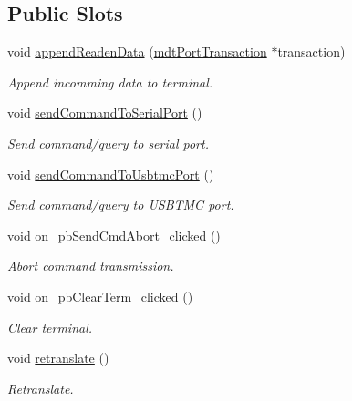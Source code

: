 \subsection*{Public Slots}
\begin{DoxyCompactItemize}
\item 
void \hyperlink{classmdt_port_term_a2c8de2e82437fc94420ccb542cc42bf2}{append\-Readen\-Data} (\hyperlink{classmdt_port_transaction}{mdt\-Port\-Transaction} $\ast$transaction)
\begin{DoxyCompactList}\small\item\em Append incomming data to terminal. \end{DoxyCompactList}\item 
void \hyperlink{classmdt_port_term_ae83cb3183870f167426d1ede3ebca5b9}{send\-Command\-To\-Serial\-Port} ()
\begin{DoxyCompactList}\small\item\em Send command/query to serial port. \end{DoxyCompactList}\item 
void \hyperlink{classmdt_port_term_a52a207c0d9343638828feb4a631eed89}{send\-Command\-To\-Usbtmc\-Port} ()
\begin{DoxyCompactList}\small\item\em Send command/query to U\-S\-B\-T\-M\-C port. \end{DoxyCompactList}\item 
void \hyperlink{classmdt_port_term_a1b232e686b401d7103eb1c682be330a9}{on\-\_\-pb\-Send\-Cmd\-Abort\-\_\-clicked} ()
\begin{DoxyCompactList}\small\item\em Abort command transmission. \end{DoxyCompactList}\item 
void \hyperlink{classmdt_port_term_abb3fc55837782dbea240b069a48b18ce}{on\-\_\-pb\-Clear\-Term\-\_\-clicked} ()
\begin{DoxyCompactList}\small\item\em Clear terminal. \end{DoxyCompactList}\item 
void \hyperlink{classmdt_port_term_a542e20f789bcdc5f2ddf2b6e698ceea2}{retranslate} ()
\begin{DoxyCompactList}\small\item\em Retranslate. \end{DoxyCompactList}\end{DoxyCompactItemize}
